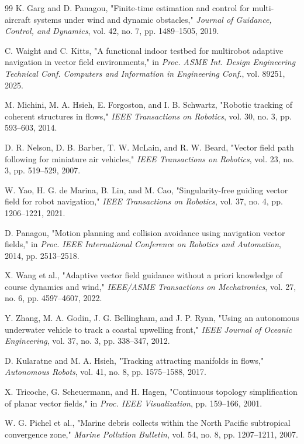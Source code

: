 \documentclass[lettersize,journal]{IEEEtran}
\begin{document}
\begin{thebibliography}{99}
 K. Garg and D. Panagou, "Finite-time estimation and control for multi-aircraft systems under wind and dynamic obstacles," \textit{Journal of Guidance, Control, and Dynamics}, vol. 42, no. 7, pp. 1489--1505, 2019.

 C. Waight and C. Kitts, "A functional indoor testbed for multirobot adaptive navigation in vector field environments," in \textit{Proc. ASME Int. Design Engineering Technical Conf. Computers and Information in Engineering Conf.}, vol. 89251, 2025.

 M. Michini, M. A. Hsieh, E. Forgoston, and I. B. Schwartz, "Robotic tracking of coherent structures in flows," \textit{IEEE Transactions on Robotics}, vol. 30, no. 3, pp. 593--603, 2014.

 D. R. Nelson, D. B. Barber, T. W. McLain, and R. W. Beard, "Vector field path following for miniature air vehicles," \textit{IEEE Transactions on Robotics}, vol. 23, no. 3, pp. 519--529, 2007.

 W. Yao, H. G. de Marina, B. Lin, and M. Cao, "Singularity-free guiding vector field for robot navigation," \textit{IEEE Transactions on Robotics}, vol. 37, no. 4, pp. 1206--1221, 2021.

 D. Panagou, "Motion planning and collision avoidance using navigation vector fields," in \textit{Proc. IEEE International Conference on Robotics and Automation}, 2014, pp. 2513--2518.

 X. Wang et al., "Adaptive vector field guidance without a priori knowledge of course dynamics and wind," \textit{IEEE/ASME Transactions on Mechatronics}, vol. 27, no. 6, pp. 4597--4607, 2022.

 Y. Zhang, M. A. Godin, J. G. Bellingham, and J. P. Ryan, "Using an autonomous underwater vehicle to track a coastal upwelling front," \textit{IEEE Journal of Oceanic Engineering}, vol. 37, no. 3, pp. 338--347, 2012.

 D. Kularatne and M. A. Hsieh, "Tracking attracting manifolds in flows," \textit{Autonomous Robots}, vol. 41, no. 8, pp. 1575--1588, 2017.

 X. Tricoche, G. Scheuermann, and H. Hagen, "Continuous topology simplification of planar vector fields," in \textit{Proc. IEEE Visualization}, pp. 159--166, 2001.

 W. G. Pichel et al., "Marine debris collects within the North Pacific subtropical convergence zone," \textit{Marine Pollution Bulletin}, vol. 54, no. 8, pp. 1207--1211, 2007.


\end{thebibliography}
\end{document}
